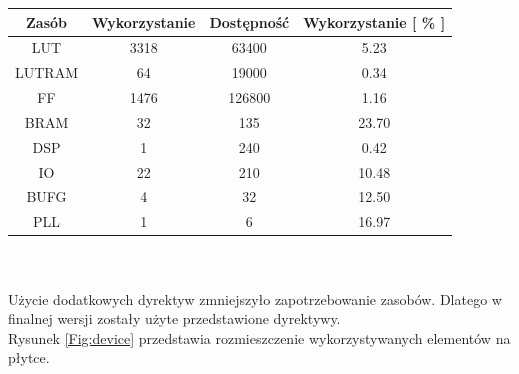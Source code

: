 \documentclass[11pt,a4paper]{article}
\begin{document}
\begin{minipage}[c]{\textwidth}
		 \begin{center}
				\begin{tabular}{|c|c|c|c|}
					\hline
					Zasób & Wykorzystanie & Dostępność & Wykorzystanie [ \% ] \\ 
					\hline
					LUT & 3318 & 63400 & 5.23  \\
					\hline
					LUTRAM & 64 & 19000 & 0.34  \\
					\hline
					FF & 1476 & 126800 & 1.16 \\
					\hline
					BRAM & 32 & 135 & 23.70 \\
					\hline
					DSP & 1 & 240 & 0.42 \\
					\hline
					IO & 22 & 210 & 10.48 \\
					\hline
					BUFG & 4 & 32 & 12.50 \\
					\hline
					PLL & 1 & 6 & 16.97 \\
					\hline																			\end{tabular}
		\end{center}
\end{minipage}\\
\\
Użycie dodatkowych dyrektyw zmniejszyło zapotrzebowanie zasobów. Dlatego w finalnej wersji zostały użyte przedstawione dyrektywy.
\\
Rysunek \ref{Fig:device} przedstawia rozmieszczenie wykorzystywanych elementów na płytce.
\end{document}
